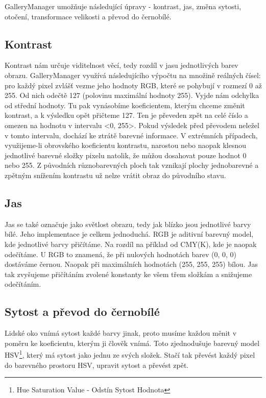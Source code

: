 \documentclass[11pt,twoside,a4paper]{book}
\begin{document}
\indent
GalleryManager umožňuje následující úpravy - kontrast, jas, změna sytosti, otočení, transformace velikosti a převod do černobílé.

\subsection{Kontrast}
\noindent
Kontrast nám určuje viditelnost věcí, tedy rozdíl v jasu jednotlivých barev obrazu. GalleryManager využívá následujícího výpočtu na množině reálných čísel: pro každý pixel zvlášť vezme jeho hodnoty RGB, které se pohybují v rozmezí 0 až 255. Od nich odečtě 127 (polovinu maximální hodnoty 255). Vyjde nám odchylka od střední hodnoty. Tu pak vynásobíme koeficientem, kterým chceme změnit kontrast, a k výsledku opět přičteme 127. Ten je převeden zpět na celé číslo a omezen na hodnotu v intervalu <0, 255>. Pokud výsledek před převodem neležel v tomto intervalu, dochází ke ztrátě barevné informace. V extrémních případech, využijeme-li obrovského koeficientu kontrastu, narostou nebo naopak klesnou jednotlivé barevné složky pixelu natolik, že můžou dosahovat pouze hodnot 0 nebo 255. Z původních různobarevných ploch tak vznikají plochy jednobarevné a zpětným snížením kontrastu už nelze vrátit obraz do původního stavu.

\subsection{Jas}
\noindent
Jas se také označuje jako světlost obrazu, tedy jak blízko jsou jednotlivé barvy bílé. Jeho implementace je celkem jednoduchá. RGB je aditivní barevný model, kde jednotlivé barvy přičítáme. Na rozdíl na příklad od CMY(K), kde je naopak odečítáme. U RGB to znamená, že při nulových hodnotách barev (0, 0, 0) dostáváme černou. Naopak při maximálních hodnotách (255, 255, 255) bílou. Jas tak zvyšujeme přičítáním zvolené konstanty ke všem třem složkám a snižujeme odečítáním.

\subsection{Sytost a převod do černobílé}
\noindent
Lidské oko vnímá sytost každé barvy jinak, proto musíme každou měnit v poměru ke koeficientu, kterým ji člověk vnímá. Toto zjednodušuje barevný model HSV\footnote{Hue Saturation Value - Odstín Sytost Hodnota}\cite{graphmodel}, který má sytost jako jednu ze svých složek. Stačí tak převést každý pixel do barevného prostoru HSV, upravit sytost a převést zpět.
\end{document}
